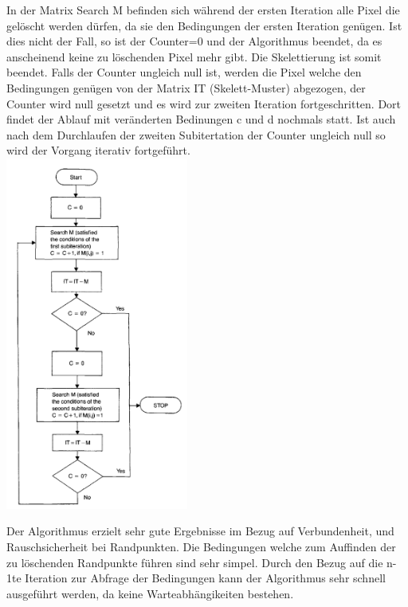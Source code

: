 In der Matrix Search M befinden sich während der ersten Iteration alle Pixel die gelöscht werden dürfen, da sie den Bedingungen der ersten Iteration genügen. Ist dies nicht der Fall, so ist der Counter=0 und der Algorithmus beendet, da es anscheinend keine zu löschenden Pixel mehr gibt. Die Skelettierung ist somit beendet.
Falls der Counter ungleich null ist, werden die Pixel welche den Bedingungen genügen von der Matrix IT (Skelett-Muster) abgezogen, der Counter wird null gesetzt und es wird zur zweiten Iteration fortgeschritten. Dort findet der Ablauf mit veränderten Bedinungen c und d nochmals statt. Ist auch nach dem Durchlaufen der zweiten Subitertation der Counter ungleich null so wird der Vorgang iterativ fortgeführt.\\




\includegraphics[width=6cm]{Res/AlgUebersicht.png}


Der Algorithmus erzielt sehr gute Ergebnisse im Bezug auf Verbundenheit, und Rauschsicherheit bei Randpunkten. Die Bedingungen welche zum Auffinden der zu löschenden Randpunkte führen sind sehr simpel. Durch den Bezug auf die n-1te Iteration zur Abfrage der Bedingungen kann der Algorithmus sehr schnell ausgeführt werden, da keine Warteabhängikeiten bestehen.
